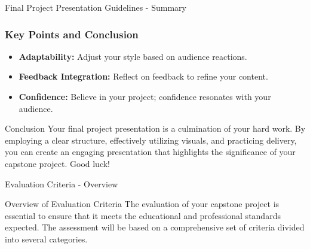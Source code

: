\documentclass[aspectratio=169]{beamer}
\begin{document}
\begin{frame}[fragile]{Final Project Presentation Guidelines - Summary}
    \frametitle{Key Points and Conclusion}
    \begin{itemize}
        \item \textbf{Adaptability:} Adjust your style based on audience reactions.
        \item \textbf{Feedback Integration:} Reflect on feedback to refine your content.
        \item \textbf{Confidence:} Believe in your project; confidence resonates with your audience.
    \end{itemize}
    
    \begin{block}{Conclusion}
        Your final project presentation is a culmination of your hard work. By employing a clear structure, effectively utilizing visuals, and practicing delivery, you can create an engaging presentation that highlights the significance of your capstone project. Good luck!
    \end{block}
\end{frame}

\begin{frame}[fragile]{Evaluation Criteria - Overview}
  \begin{block}{Overview of Evaluation Criteria}
    The evaluation of your capstone project is essential to ensure that it meets the educational and professional standards expected. The assessment will be based on a comprehensive set of criteria divided into several categories.
  \end{block}
\end{frame}
\end{document}
